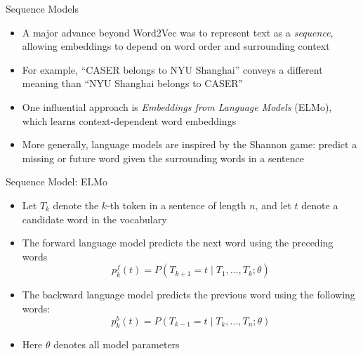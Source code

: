 \documentclass[aspectratio=1610,12pt,xcolor=dvipsnames]{beamer}
\begin{document}
\begin{frame}{Sequence Models}

\begin{itemize}
    \item A major advance beyond Word2Vec was to represent text as a \textit{sequence}, allowing embeddings to depend on word order and surrounding context
    
    \item For example, ``CASER belongs to NYU Shanghai'' conveys a different meaning than ``NYU Shanghai belongs to CASER'' \pause
    
    \item One influential approach is \textit{Embeddings from Language Models} (ELMo), which learns context-dependent word embeddings
    
    \item More generally, language models are inspired by the Shannon game: predict a missing or future word given the surrounding words in a sentence
\end{itemize}

\end{frame}

\begin{frame}{Sequence Model: ELMo}

\begin{itemize}
    \item Let $T_k$ denote the $k$-th token in a sentence of length $n$, and let $t$ denote a candidate word in the vocabulary
    \item The forward language model predicts the next word using the preceding words
    \[
        p_k^{f}(t)
        =
        P\!\left(
        T_{k+1}=t
        \mid
        T_1,\ldots,T_k;\theta
        \right)
    \]
    \item The backward language model predicts the previous word using the following words:
    \[
        p_k^{b}(t)
        =
        P\!\left(
        T_{k-1}=t
        \mid
        T_k,\ldots,T_n;\theta
        \right)
    \]
    \item Here $\theta$ denotes all model parameters
\end{itemize}
\end{frame}
\end{document}
